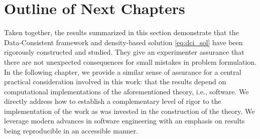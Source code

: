 \section{Outline of Next Chapters}\label{sec:outline}
Taken together, the results summarized in this section demonstrate that the Data-Consistent framework and density-based solution \eqref{eq:dci_sol} have been rigorously constructed and studied.
They give an experimenter assurance that there are not unexpected consequences for small mistakes in problem formulation.
In the following chapter, we provide a similar sense of assurance for a central practical consideration involved in this work: that the results depend on computational implementations of the aforementioned theory, i.e., software.
We directly address how to establish a complementary level of rigor to the implementation of the work as was invested in the construction of the theory.
We leverage modern advances in software engineering with an emphasis on results being reproducible in an accessible manner.

